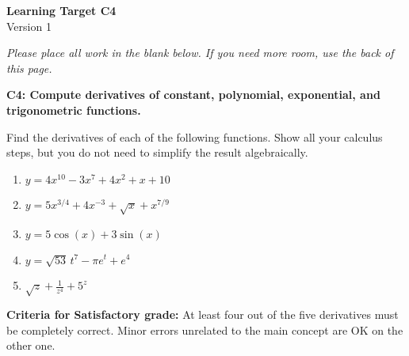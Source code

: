 \documentclass[10pt]{article}
\begin{document}
	\vspace*{0in}

		\begin{center}
			\textbf{Learning Target C4} \\
			{Version 1} \\
		\end{center}

\emph{Please place all work in the blank below. If you need more room, use the back of this page.}

\begin{framed}
	\textbf{C4: Compute derivatives of constant, polynomial, exponential, and trigonometric functions.}
\end{framed}

Find the derivatives of each of the following functions. Show all your calculus steps, but you do not need to simplify the result algebraically. 

\begin{enumerate}
    \item $y = 4x^{10} - 3x^7 + 4x^2 + x + 10$
    \item $y = 5x^{3/4} + 4x^{-3} + \sqrt{x} + x^{7/9}$
    \item $y = 5 \cos(x) + 3 \sin(x)$
    \item $y = \sqrt{53} \, t^7 - \pi e^t + e^4$
    \item $\sqrt{z} + \frac{1}{z^4} + 5^z$
\end{enumerate}

\vfill


\begin{small}
    \begin{framed}
        	\textbf{Criteria for Satisfactory grade:} At least four out of the five derivatives must be completely correct. Minor errors unrelated to the main concept are OK on the other one. 
    \end{framed}

\end{small}
\end{document}
